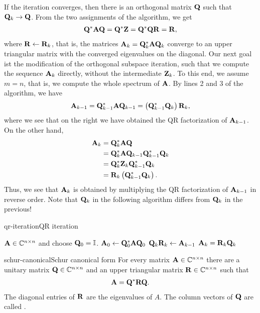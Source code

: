 \begin{remark}
  If the iteration converges, then there is an orthogonal matrix $\mathbf Q$ such that $\mathbf Q_k\to \mathbf Q$.
  From the two assignments of the algorithm, we get
  \begin{gather}
    \mathbf Q^* \mathbf A \mathbf Q = \mathbf Q^* \mathbf Z = \mathbf Q^*\mathbf Q\mathbf R = \mathbf R,
  \end{gather}
  where $\mathbf R\leftarrow\mathbf R_k$, that is, the matrices
  $\mathbf A_k = \mathbf Q_k^*\mathbf A\mathbf Q_k$ converge to an upper triangular
  matrix with the converged eigenvalues on the diagonal. Our next goal
  ist the modification of the orthogonal subspace iteration, such that
  we compute the sequence $\mathbf A_k$ directly, without the intermediate
  $\mathbf Z_k$. To this end, we assume $m=n$, that is, we compute the
  whole spectrum of $\mathbf A$. By lines 2 and 3 of the algorithm, we have
  \begin{gather*}
    \mathbf A_{k-1} = \mathbf Q_{k-1}^*\mathbf A\mathbf Q_{k-1} = \left(\mathbf Q_{k-1}^*\mathbf Q_{k}\right)\mathbf R_k,
  \end{gather*}
  where we see that on the right we have obtained the QR factorization of $\mathbf A_{k-1}$.
  On the other hand,
  \begin{align*}
    \mathbf A_k
    &= \mathbf Q_k^*\mathbf A\mathbf Q\\
    &= \mathbf Q_k^*\mathbf A\mathbf Q_{k-1}\mathbf Q_{k-1}^*\mathbf Q_k\\
    &= \mathbf Q_k^*\mathbf Z_k\mathbf Q_{k-1}^*\mathbf Q_k\\
    &= \mathbf R_k \left(\mathbf Q_{k-1}^*\mathbf Q_k\right).
  \end{align*}
  Thus, we see that $\mathbf A_k$ is obtained by multiplying the QR
  factorization of $\mathbf A_{k-1}$ in reverse order. Note that $\mathbf Q_k$
  in the following algorithm differs from $\mathbf Q_k$ in the previous!
\end{remark}

\begin{Algorithm*}{qr-iteration}{QR iteration}
  \begin{algorithmic}[1]
    \Require $\mathbf A\in\mathbb C^{n\times n}$ and choose $\mathbf Q_0 = \mathbb I$.
    \State $\mathbf A_0 \gets \mathbf Q_0^*\mathbf A\mathbf Q_0$
    \State $\mathbf Q_k\mathbf R_k \gets \mathbf A_{k-1}$ 
    \State $\mathbf A_{k} = \mathbf R_k\mathbf Q_k$
    \EndFor
  \end{algorithmic}
\end{Algorithm*}

\begin{Theorem*}{schur-canonical}{Schur canonical form}
  For every matrix $\mathbf A\in\mathbb C^{n\times n}$ there are a unitary matrix
  $\mathbf Q\in\mathbb C^{n\times n}$ and an upper triangular matrix $\mathbf R\in\mathbb C^{n\times n}$ such
  that
  \begin{gather}
    \mathbf A = \mathbf Q^* \mathbf R \mathbf Q.
  \end{gather}
  The diagonal entries of $\mathbf R$ are the eigenvalues of $A$. The
  column vectors of $\mathbf Q$ are called .
\end{Theorem*}

